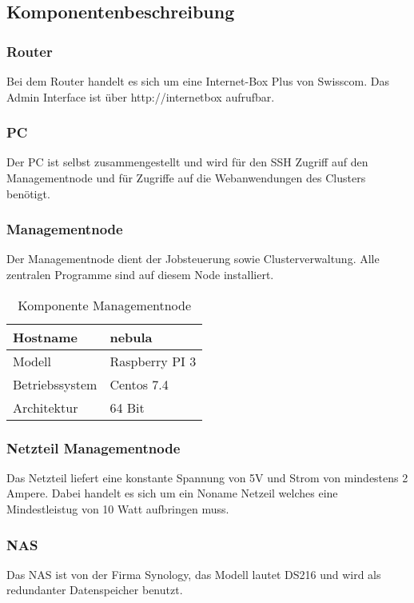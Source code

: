 \subsection{Komponentenbeschreibung}
\subsubsection{Router}

Bei dem Router handelt es sich um eine Internet-Box Plus von Swisscom. Das Admin Interface ist über http://internetbox aufrufbar.

\subsubsection{PC}
Der PC ist selbst zusammengestellt und wird für den SSH Zugriff auf den Managementnode und für Zugriffe auf die Webanwendungen des Clusters benötigt.

\subsubsection{Managementnode}
Der Managementnode dient der Jobsteuerung sowie Clusterverwaltung. Alle zentralen Programme sind auf diesem Node installiert.

\begin{table}[H]
\centering
\begin{tabular}{|l|l|}
\hline
Hostname & nebula \\\hline
Modell & Raspberry PI 3 \\\hline
Betriebssystem & Centos 7.4 \\\hline
Architektur & 64 Bit \\\hline
\end{tabular}
\caption{Komponente Managementnode}
\end{table}

\subsubsection{Netzteil Managementnode}
Das Netzteil liefert eine konstante Spannung von 5V und Strom von mindestens 2 Ampere. Dabei handelt es sich um ein Noname Netzeil welches eine Mindestleistug von 10 Watt aufbringen muss.

\subsubsection{NAS}
Das NAS ist von der Firma Synology, das Modell lautet DS216 und wird als redundanter Datenspeicher benutzt.

